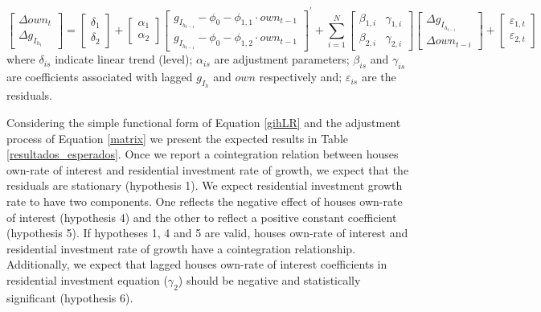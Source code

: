 \documentclass[12pt, a4paper]{article}
\begin{document}
\begin{equation}
\label{matrix}
\begin{bmatrix}
\Delta own_{t}\\
\Delta g_{I_{h_{t}}}
\end{bmatrix} = \begin{bmatrix}\delta_{1}\\ \delta_{2}\end{bmatrix} + \begin{bmatrix}\alpha_{1}\\ \alpha_{2}\end{bmatrix} \begin{bmatrix}g_{I_{h_{t-1}}} - \phi_{0} - \phi_{1,1}\cdot own_{t-1}\\g_{I_{h_{t-1}}} - \phi_{0} - \phi_{1,2}\cdot own_{t-1}\end{bmatrix}^{\prime} + \sum^N_{i=1} \begin{bmatrix}\beta_{1,i} & \gamma_{1,i} \\\beta_{2,i} & \gamma_{2,i} \end{bmatrix} \begin{bmatrix}\Delta g_{I_{h_{t-i}}} \\\Delta own_{t-i}\end{bmatrix} + \begin{bmatrix}\varepsilon_{1,t}\\\varepsilon_{2,t}\end{bmatrix}
\end{equation}
where \(\delta_{is}\) indicate linear trend (level);
\(\alpha_{is}\) are adjustment parameters;
\(\beta_{is}\) and \(\gamma_{is}\) are coefficients associated with lagged \(g_{I_h}\) and \(own\) respectively and; \(\varepsilon_{is}\) are the residuals.

Considering the simple functional form of Equation \ref{gihLR} and the adjustment process of Equation \ref{matrix} we present the expected results in Table \ref{resultados_esperados}.
Once we report a cointegration relation between houses own-rate of interest and residential investment rate of growth, we expect that the residuals are stationary (hypothesis 1).
We expect residential investment growth rate to have two components.
One reflects the negative effect of houses own-rate of interest (hypothesis 4) and the other to reflect a positive constant coefficient (hypothesis 5).
If  hypotheses 1, 4 and 5 are valid, houses own-rate of interest and residential investment rate of growth have a cointegration relationship.
Additionally, we expect that lagged houses own-rate of interest coefficients in residential investment equation (\(\gamma_{2}\)) should be negative and statistically significant (hypothesis 6).
\end{document}
